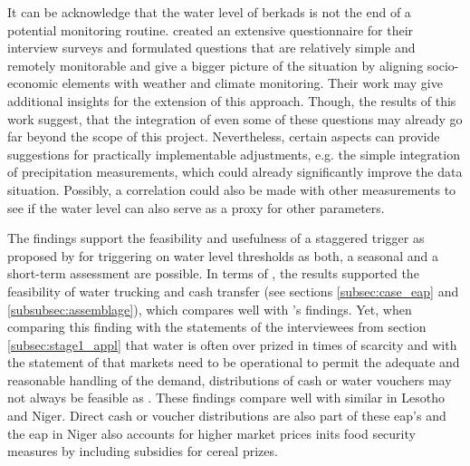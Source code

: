 It can be acknowledge that the water level of berkads is not the end of a potential monitoring routine. \Textcite{unitednationschildrensfundunicefandworldhealthCoreQuestionsWater2018} created an extensive questionnaire for their interview surveys and \textcite{enenkelWhyPredictClimate2020} formulated questions that are relatively simple and remotely monitorable and give a bigger picture of the situation by aligning socio-economic elements with weather and climate monitoring. Their work may give additional insights for the extension of this approach. Though, the results of this work suggest, that the integration of even some of these questions may already go far beyond the scope of this project. Nevertheless, certain aspects can provide suggestions for practically implementable adjustments, e.g. the simple integration of precipitation measurements, which could already significantly improve the data situation. Possibly, a correlation could also be made with other measurements to see if the water level can also serve as a proxy for other parameters.

The findings support the feasibility and usefulness of a staggered trigger as proposed by \textcite{rcrcForecastbasedFinancingEarly2020} for triggering on water level thresholds as both, a seasonal and a short-term assessment are possible. In terms of , the results supported the feasibility of water trucking and cash transfer  (see sections \ref{subsec:case_eap} and \ref{subsubsec:assemblage}), which compares well with \citeauthor{gettliffeOCHAAnticipatoryAction2021}'s \citeyear{gettliffeOCHAAnticipatoryAction2021} findings. Yet, when comparing this finding with the statements of the interviewees from section \ref{subsec:stage1_appl} that water is often over prized in times of scarcity and with the statement of \textcite{ochaANTICIPATORYACTIONPLAN2020} that markets need to be operational to permit the adequate and reasonable handling of the demand, distributions of cash or water vouchers may not always be feasible as . These findings compare well with similar  in Lesotho and Niger. Direct cash or voucher distributions are also part of these \acrshort{eap}'s  and the \acrshort{eap} in Niger also accounts for higher market prices inits food security measures by including subsidies for cereal prizes.

